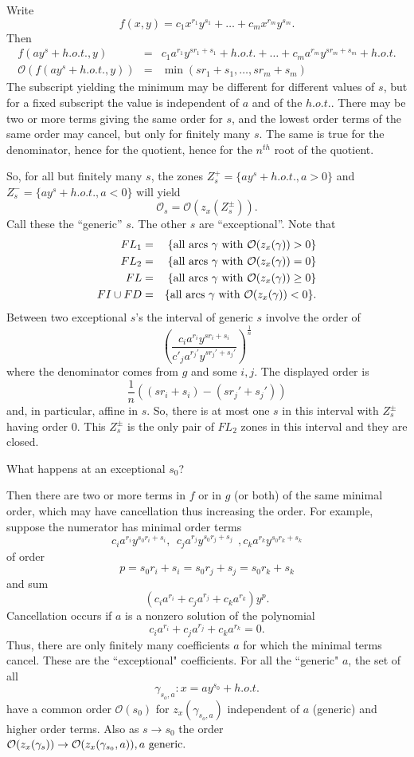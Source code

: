 \documentclass[article]{amsart}
\newcommand{\0}{{\bf 0}}
\begin{document}
Write
$$ f(x,y) = c_1x^{r_1}y^{s_1} + \ldots +c_mx^{r_m}y^{s_m}.$$
Then
\begin{eqnarray*} 
f(ay^s + h.o.t., y) &=& c_1a^{r_1}y^{sr_1+s_1} + h.o.t. +\ldots +c_ma^{r_m}y^{sr_m+s_m} + h.o.t. \\
\mathcal{O}(f(ay^s + h.o.t., y)) &=&\min(sr_1+s_1, \ldots, sr_m+s_m)
\end{eqnarray*}
\noindent  The subscript yielding the minimum may be different for different values of $s$, but for a fixed subscript the value is independent of $a$ and of the $h.o.t.$.  There may be two or more terms giving the same order for $s$, and the lowest order terms of the same order may cancel, but only for finitely many $s$.  The same is true for the denominator, hence for the quotient, hence for the $n^{th}$ root of the quotient.  

So, for all but finitely many $s$, the zones $Z^+_s = \{ ay^s + h.o.t., a> 0\}$ and $Z^-_s = \{ ay^s + h.o.t., a< 0\}$ will yield 
$$\mathcal{O}_s = \mathcal{O}(z_x(Z^{\pm}_s)).$$  
\noindent Call these the ``generic'' $s$.  The other $s$ are ``exceptional''.
Note that
\begin{eqnarray*}
FL_1 &=& \{ {\rm all\ arcs\ } \gamma\ {\rm with\ } \mathcal{O}(z_x(\gamma)) > 0\}\\
FL_2 &=& \{ {\rm all\ arcs\ } \gamma\ {\rm with\ } \mathcal{O}(z_x(\gamma)) = 0\}\\
FL &=& \{ {\rm all\ arcs\ } \gamma\ {\rm with\ } \mathcal{O}(z_x(\gamma)) \ge 0\}\\
FI\cup FD &=& \{ {\rm all\ arcs\ } \gamma\ {\rm with\ } \mathcal{O}(z_x(\gamma)) < 0\}.
\end{eqnarray*}
Between two exceptional $s$'s the interval of generic $s$ involve the order of
$$\left( \frac{c_ia^{r_i}y^{sr_i +s_i}}{c'_j a^{r_j'} y^{sr_j'+s_j'}} \right)^{\frac{1}{n}}$$
\noindent where the denominator comes from $g$ and some $i,j$. The displayed order 
is $$\frac{1}{n}((sr_i + s_i) - (sr_j' + s_j'))$$
\noindent and, in particular, affine in $s$.  So, there is at most one $s$ in this interval with $Z^{\pm}_s$ having order 0.  
This $Z^{\pm}_s$ is the only pair of $FL_2$ zones in this interval and they are closed.  

What happens at an exceptional $s_0$?

Then there are two or more terms in $f$ or in $g$ (or both) of the same minimal order, which may have cancellation thus increasing the order.  For example, suppose the numerator has minimal order terms
$$c_ia^{r_i}y^{s_0 r_i + s_i},\ \ c_ja^{r_j}y^{s_0 r_j+ s_j}\ \ ,c_ka^{r_k}y^{s_0 r_k + s_k}$$
of order
$$p=s_0r_i + s_i = s_0 r_j + s_j = s_0 r_k + s_k$$
and sum
$$(c_ia^{r_i} + c_ja^{r_j} + c_ka^{r_k})y^p.$$
Cancellation occurs if $a$ is a nonzero solution of the polynomial 
$$c_ia^{r_i} + c_ja^{r_j} + c_ka^{r_k} = 0.$$
Thus, there are only finitely many coefficients $a$ for  which the minimal terms cancel.  These are the ``exceptional" coefficients.  For all the ``generic" $a$, the set of all
$$\gamma_{s_o,a}: x = ay^{s_0} + h.o.t.$$
have a common order $\mathcal{O}(s_0)$ for $z_x(\gamma_{s_o,a})$ independent of $a$ (generic) and higher order terms.  Also
as $s \rightarrow s_0$ the order $\mathcal{O}(z_x(\gamma_s))\rightarrow \mathcal{O}(z_x(\gamma_{s_0},a)), a\ {\rm generic}.$
 
\end{document}
